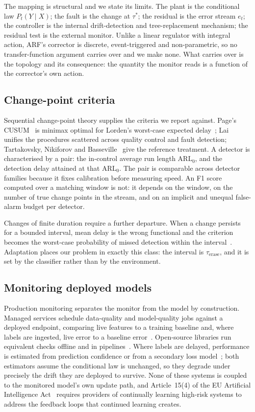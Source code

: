 The mapping is structural and we state its limits. The plant is the conditional
law $P_t(Y \mid X)$; the fault is the change at $\tau^{*}$; the residual is the
error stream $e_t$; the controller is the internal drift-detection and
tree-replacement mechanism; the residual test is the external monitor. Unlike a
linear regulator with integral action, ARF's corrector is discrete,
event-triggered and non-parametric, so no transfer-function argument carries
over and we make none. What carries over is the topology and its consequence:
the quantity the monitor reads is a function of the corrector's own action.

\subsection{Change-point criteria}
Sequential change-point theory supplies the criteria we report against. Page's
CUSUM~\cite{page_1954} is minimax optimal for Lorden's worst-case expected
delay~\cite{lorden_1971, moustakides_1986}; Lai~\cite{lai_1995} unifies the
procedures scattered across quality control and fault detection; Tartakovsky,
Nikiforov and Basseville~\cite{tartakovsky_2014} give the reference treatment.
A detector is characterised by a pair: the in-control average run length
$\mathrm{ARL}_0$, and the detection delay attained at that $\mathrm{ARL}_0$. The
pair is comparable across detector families because it fixes calibration before
measuring speed. An F1 score computed over a matching window is not: it depends
on the window, on the number of true change points in the stream, and on an
implicit and unequal false-alarm budget per detector.

Changes of finite duration require a further departure. When a change persists
for a bounded interval, mean delay is the wrong functional and the criterion
becomes the worst-case probability of missed detection within the
interval~\cite{nikiforov_2012, tartakovsky_2023_transient}. Adaptation places our
problem in exactly this class: the interval is $\tau_{\mathrm{erase}}$, and it is
set by the classifier rather than by the environment.

\subsection{Monitoring deployed models}
Production monitoring separates the monitor from the model by
construction. Managed services schedule data-quality and model-quality jobs
against a deployed endpoint, comparing live features to a training
baseline and, where labels are ingested, live error to a baseline
error~\cite{gcp_vertex_monitoring, aws_model_monitor}. Open-source libraries run
equivalent checks offline and in pipelines~\cite{evidently_lib}. Where labels are
delayed, performance is estimated from prediction confidence or from a secondary
loss model~\cite{nannyml_pe}; both estimators assume the conditional law is
unchanged, so they degrade under precisely the drift they are deployed to
survive. None of these systems is coupled to the monitored model's own update
path, and Article~15(4) of the EU Artificial Intelligence
Act~\cite{eu_ai_act_2024} requires providers of continually learning high-risk
systems to address the feedback loops that continued learning creates.

